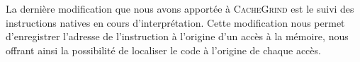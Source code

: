 La dernière modification que nous avons apportée à \textsc{CacheGrind} est le suivi des instructions natives en cours d'interprétation.
Cette modification nous permet d'enregistrer l'adresse de l'instruction à l'origine d'un accès à la mémoire, nous offrant ainsi la possibilité de localiser le code à l'origine de chaque accès.





